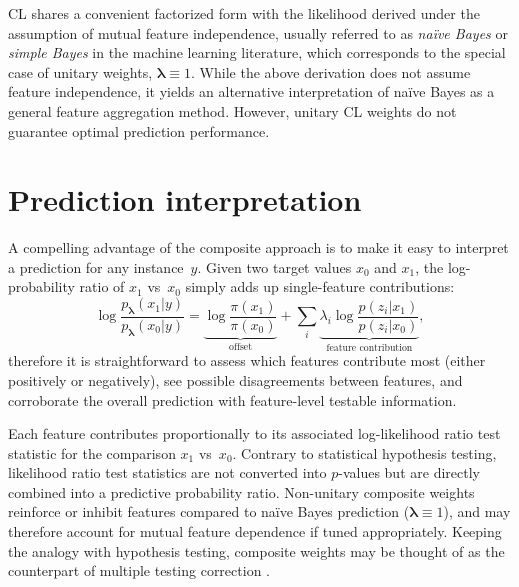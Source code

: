 \documentclass[english]{scrartcl}
\newcommand{\lda}{{\boldsymbol{\lambda}}}
\begin{document}
CL shares a convenient factorized form with the likelihood derived under the assumption of mutual feature independence, usually referred to as {\em na\"ive Bayes} or {\em simple Bayes} in the machine learning literature, which corresponds to the special case of unitary weights, $\lda\equiv 1$. While the above derivation does not assume feature independence, it yields an alternative interpretation of na\"ive Bayes as a general feature aggregation method. However, unitary CL weights do not guarantee optimal prediction performance.


\section{Prediction interpretation}

A compelling advantage of the composite approach is to make it easy to interpret a prediction for any instance~$y$. Given two target values $x_0$ and $x_1$, the log-probability ratio of $x_1$ vs~$x_0$ simply adds up single-feature contributions: 
$$
\log \frac{p_\lda(x_1|y)}{p_\lda(x_0|y)}
= 
\underbrace{\log \frac{\pi(x_1)}{\pi(x_0)}}_{\text{offset}}
+ \sum_i \underbrace{\lambda_i \log \frac{p(z_i|x_1)}{p(z_i|x_0)}}_{\text{feature contribution}},
$$
therefore it is straightforward to assess which features contribute most (either positively or negatively), see possible disagreements between features, and corroborate the overall prediction with feature-level testable information. 

Each feature contributes proportionally to its associated log-likelihood ratio test statistic for the comparison $x_1$ vs~$x_0$. Contrary to statistical hypothesis testing, likelihood ratio test statistics are not converted into $p$-values but are directly combined into a predictive probability ratio. Non-unitary composite weights reinforce or inhibit features compared to na\"ive Bayes prediction ($\lda\equiv 1$), and may therefore account for mutual feature dependence if tuned appropriately. Keeping the analogy with hypothesis testing, composite weights may be thought of as the counterpart of multiple testing correction \cite{Benjamini-10}.



\end{document}
